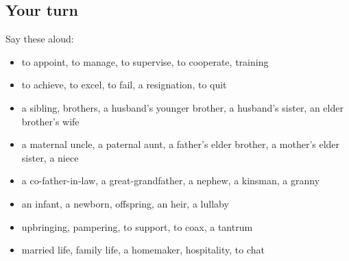 \subsection*{Your turn}
Say these aloud:

\begin{itemize}
\raggedright
  \item to appoint, to manage, to supervise, to cooperate, training
  \item to achieve, to excel, to fail, a resignation, to quit
  \item a sibling, brothers, a husband's younger brother, a husband's sister, an elder brother's wife
  \item a maternal uncle, a paternal aunt, a father's elder brother, a mother's elder sister, a niece
  \item a co-father-in-law, a great-grandfather, a nephew, a kinsman, a granny
  \item an infant, a newborn, offspring, an heir, a lullaby
  \item upbringing, pampering, to support, to coax, a tantrum
  \item married life, family life, a homemaker, hospitality, to chat
\end{itemize}

